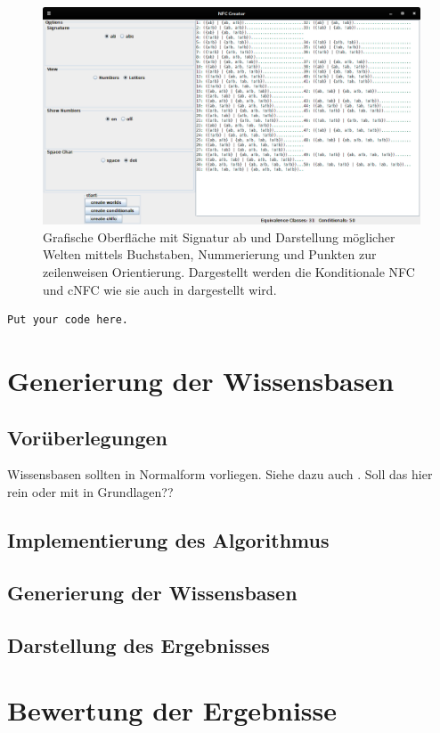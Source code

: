 \documentclass[12pt,a4paper]{article}
\begin{document}
\begin{figure}
	\centering
	\includegraphics[width=1\linewidth]{bilder/nfc-other-options.png}
	\caption{Grafische Oberfläche mit Signatur {ab} und Darstellung möglicher Welten mittels Buchstaben, Nummerierung und Punkten zur zeilenweisen Orientierung. Dargestellt werden die Konditionale NFC und cNFC wie sie auch in \cite{beierle19} dargestellt wird.}
	\label{img:nfc-other-options}
\end{figure}
\begin{lstlisting}
Put your code here.
\end{lstlisting}


\section{Generierung der Wissensbasen}
\subsection{Vorüberlegungen}
Wissensbasen sollten in Normalform vorliegen. Siehe dazu auch \cite{beierle17b}. Soll das hier rein oder mit in Grundlagen??
\subsection{Implementierung des Algorithmus}
\subsection{Generierung der Wissensbasen}
\subsection{Darstellung des Ergebnisses}
\section{Bewertung der Ergebnisse}

\newpage

 
\end{document}
